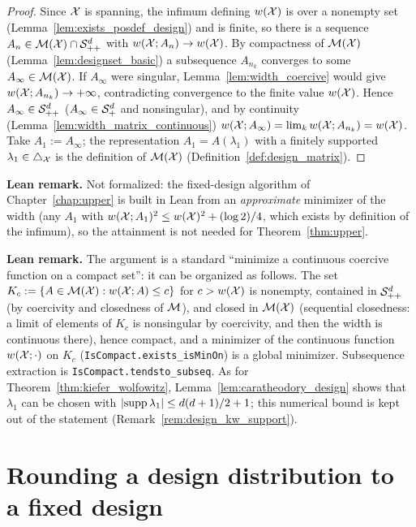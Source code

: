 \begin{proof}
Since $\mathcal{X}$ is spanning, the infimum defining $w(\mathcal{X})$ is over a nonempty set (Lemma~\ref{lem:exists_posdef_design})
and is finite, so there is a sequence $A_n \in \mathcal{M}(\mathcal{X})\cap\mathcal{S}_{++}^{d}$ with
$w(\mathcal{X};A_n) \to w(\mathcal{X})$. By compactness of $\mathcal{M}(\mathcal{X})$
(Lemma~\ref{lem:designset_basic}) a subsequence $A_{n_k}$ converges to some
$A_\infty \in \mathcal{M}(\mathcal{X})$. If $A_\infty$ were singular, Lemma~\ref{lem:width_coercive}
would give $w(\mathcal{X};A_{n_k}) \to +\infty$, contradicting convergence to the finite value
$w(\mathcal{X})$. Hence $A_\infty \in \mathcal{S}_{++}^{d}$ ($A_\infty \in \mathcal{S}_{+}^{d}$ and nonsingular), and by continuity
(Lemma~\ref{lem:width_matrix_continuous}) $w(\mathcal{X};A_\infty) = \lim_kw(\mathcal{X};A_{n_k}) =
w(\mathcal{X})$. Take $A_1 := A_\infty$; the representation $A_1 = A(\lambda_1)$ with a finitely
supported $\lambda_1 \in \triangle_{\mathcal{X}}$ is the definition of $\mathcal{M}(\mathcal{X})$
(Definition~\ref{def:design_matrix}).
\end{proof}

\textbf{Lean remark.} Not formalized: the fixed-design algorithm of Chapter~\ref{chap:upper} is
built in Lean from an \emph{approximate} minimizer of the width (any $A_1$ with
$w(\mathcal{X};A_1)^2 \le w(\mathcal{X})^2 + (\log 2)/4$, which exists by definition of the infimum),
so the attainment is not needed for Theorem~\ref{thm:upper}.

\textbf{Lean remark.} The argument is a standard ``minimize a continuous coercive function on a
compact set'': it can be organized as follows. The set $K_c := \{A \in \mathcal{M}(\mathcal{X}) :
w(\mathcal{X};A) \le c\}$ for $c > w(\mathcal{X})$ is nonempty, contained in $\mathcal{S}_{++}^{d}$ (by coercivity and
closedness of $\mathcal{M}$), and closed in $\mathcal{M}(\mathcal{X})$ (sequential closedness: a limit of
elements of $K_c$ is nonsingular by coercivity, and then the width is continuous there), hence
compact, and a minimizer of the continuous function $w(\mathcal{X};\cdot)$ on $K_c$
(\texttt{IsCompact.exists\_isMinOn}) is a global minimizer. Subsequence extraction is
\texttt{IsCompact.tendsto\_subseq}. As for Theorem~\ref{thm:kiefer_wolfowitz},
Lemma~\ref{lem:caratheodory_design} shows that $\lambda_1$ can be chosen with
$\lvert \operatorname{supp}\lambda_1 \rvert \le d(d+1)/2+1$; this numerical bound is kept out of the statement
(Remark~\ref{rem:design_kw_support}).

\section{Rounding a design distribution to a fixed design}
\label{sec:rounding}

